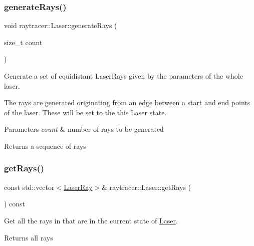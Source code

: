 \subsubsection{\texorpdfstring{generate\+Rays()}{generateRays()}}
{\footnotesize\ttfamily void raytracer\+::\+Laser\+::generate\+Rays (\begin{DoxyParamCaption}\item[{size\+\_\+t}]{count }\end{DoxyParamCaption})}



Generate a set of equidistant Laser\+Rays given by the parameters of the whole laser. 

The rays are generated originating from an edge between a start and end points of the laser. These will be set to the this \hyperlink{classraytracer_1_1Laser}{Laser} state.


\begin{DoxyParams}{Parameters}
{\em count} & number of rays to be generated \\
\hline
\end{DoxyParams}
\begin{DoxyReturn}{Returns}
a sequence of rays 
\end{DoxyReturn}
\mbox{\label{classraytracer_1_1Laser_a1178e8800c8cd90d5274b2854c9f2fe5}} 
\subsubsection{\texorpdfstring{get\+Rays()}{getRays()}}
{\footnotesize\ttfamily const std\+::vector$<$\hyperlink{classraytracer_1_1LaserRay}{Laser\+Ray}$>$\& raytracer\+::\+Laser\+::get\+Rays (\begin{DoxyParamCaption}{ }\end{DoxyParamCaption}) const}



Get all the rays in that are in the current state of \hyperlink{classraytracer_1_1Laser}{Laser}. 

\begin{DoxyReturn}{Returns}
all rays 
\end{DoxyReturn}
\mbox{\label{classraytracer_1_1Laser_aeb6e2f23b0ce9b8e74eea3dc0f543345}} 
